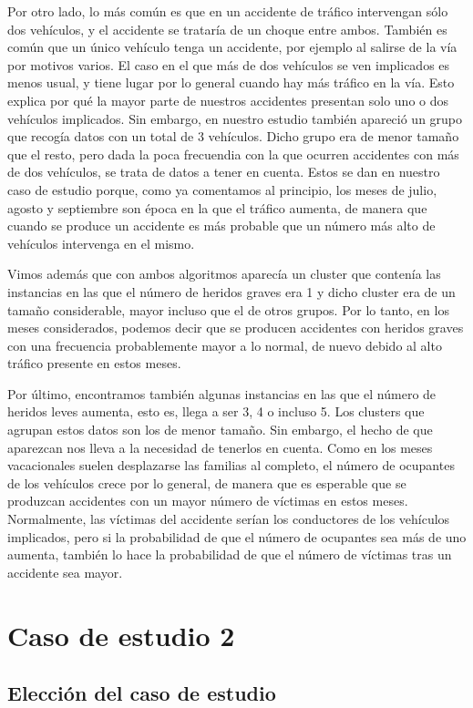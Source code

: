 \documentclass[a4paper,11pt]{book}
\begin{document}
Por otro lado, lo más común es que en un accidente de tráfico intervengan sólo dos vehículos, y el accidente se trataría de un choque entre ambos. También es común que un único vehículo tenga un accidente, por ejemplo al salirse de la vía por motivos varios. El caso en el que más de dos vehículos se ven implicados es menos usual, y tiene lugar por lo general cuando hay más tráfico en la vía. Esto explica por qué la mayor parte de nuestros accidentes presentan solo uno o dos vehículos implicados. Sin embargo, en nuestro estudio también apareció un grupo que recogía datos con un total de 3 vehículos. Dicho grupo era de menor tamaño que el resto, pero dada la poca frecuendia con la que ocurren accidentes con más de dos vehículos, se trata de datos a tener en cuenta. Estos se dan en nuestro caso de estudio porque, como ya comentamos al principio, los meses de julio, agosto y septiembre son época en la que el tráfico aumenta, de manera que cuando se produce un accidente es más probable que un número más alto de vehículos intervenga en el mismo. 

Vimos además que con ambos algoritmos aparecía un cluster que contenía las instancias en las que el número de heridos graves era 1 y dicho cluster era de un tamaño considerable, mayor incluso que el de otros grupos. Por lo tanto, en los meses considerados, podemos decir que se producen accidentes con heridos graves con una frecuencia probablemente mayor a lo normal, de nuevo debido al alto tráfico presente en estos meses.

Por último, encontramos también algunas instancias en las que el número de heridos leves aumenta, esto es, llega a ser 3, 4 o incluso 5. Los clusters que agrupan estos datos son los de menor tamaño. Sin embargo, el hecho de que aparezcan nos lleva a la necesidad de tenerlos en cuenta. Como en los meses vacacionales suelen desplazarse las familias al completo, el número de ocupantes de los vehículos crece por lo general, de manera que es esperable que se produzcan accidentes con un mayor número de víctimas en estos meses. Normalmente, las víctimas del accidente serían los conductores de los vehículos implicados, pero si la probabilidad de que el número de ocupantes sea más de uno aumenta, también lo hace la probabilidad de que el número de víctimas tras un accidente sea mayor. 

\newpage
\section{Caso de estudio 2}
\subsection{Elección del caso de estudio}
\end{document}
